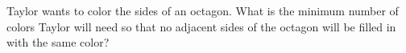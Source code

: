 Taylor wants to color the sides of an octagon. What is the minimum number of colors Taylor will need so that no adjacent sides of the octagon will be filled in with the same color?
